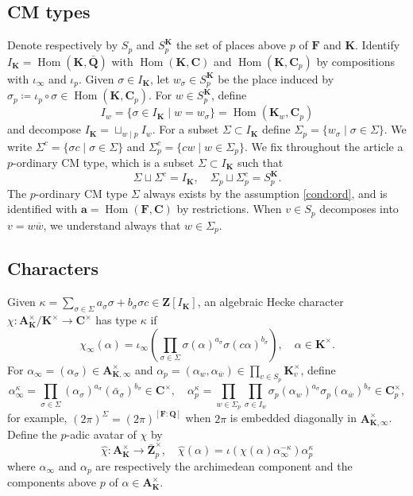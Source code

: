 \documentclass[leqno]{amsart}
\theoremstyle{definition}
\theoremstyle{remark}
\newcommand{\Q}{{\mathbf{Q}}}
\newcommand{\Z}{{\mathbf{Z}}}
\newcommand{\C}{\mathbf C}
\newcommand{\A}{\mathbf A}
\newcommand{\arch}{\mathbf{a}}
\DeclareMathOperator{\Hom}{Hom}
\newcommand{\F}{{\mathbf{F}}} %
\newcommand{\K}{{\mathbf{K}}} %
\newcommand{\bw}{\overline{w}}
\begin{document}
\subsection{CM types}

Denote respectively by $S_p$ and $S_p^\K$ the set of places above $p$
of $\F$ and $\K$.
Identify $I_\K=\Hom(\K,\bar{\Q})$ with
$\Hom(\K,\C)$ and $\Hom(\K,\C_p)$ by compositions with $\iota_\infty$ and $\iota_p$.
Given $\sigma\in I_\K$,
let $w_\sigma\in S_p^\K$ be the place induced by
$\sigma_p\coloneqq \iota_p\circ \sigma\in\Hom(\K,\C_p)$.
For $w\in S_p^\K$, define
\[
    I_w=\{\sigma\in I_\K\mid w=w_\sigma \}=\Hom(\K_w,\C_p)
\]
and decompose $I_\K=\sqcup_{w\mid p}I_w$.
For a subset $\Sigma\subset I_\K$
define $\Sigma_p=\{w_\sigma\mid \sigma\in \Sigma\}$.
We write
$\Sigma^c=\{\sigma c\mid \sigma\in \Sigma\}$ and 
$\Sigma_p^c=\{cw\mid w\in \Sigma_p\}$.
We fix throughout the article a $p$-ordinary CM type,
which is a subset $\Sigma\subset I_\K$ such that
\[
    \Sigma\sqcup \Sigma^c=I_\K,\quad
    \Sigma_p\sqcup \Sigma_p^c=S_p^\K.
\]
The $p$-ordinary CM type $\Sigma$
always exists by the assumption \eqref{cond:ord},
and is identified with $\arch=\Hom(\F,\C)$ by restrictions.
When $v\in S_p$ decomposes into $v=w\bw$,
we understand always that $w\in \Sigma_p$.

\subsection{Characters}

Given 
$\kappa=\sum_{\sigma\in \Sigma} a_\sigma\sigma+b_\sigma\sigma c\in \Z[I_\K]$,
an algebraic Hecke character 
$\chi\colon \A_\K^\times/\K^\times\to \C^\times$ 
has type $\kappa$ if
\[
    \chi_\infty(\alpha)=
    \iota_\infty \left(\prod_{\sigma\in \Sigma} 
    \sigma(\alpha)^{a_\sigma}\sigma(c \alpha)^{b_\sigma}\right),\quad
    \alpha\in \K^\times.
\]
For $\alpha_\infty=(\alpha_\sigma)\in \A_{\K,\infty}^\times$
and $\alpha_p=(\alpha_w,\alpha_{\bw})\in \prod_{v\in S_p}\K_v^\times$, 
define
\[
    \alpha_\infty^\kappa=
    \prod_{\sigma\in \Sigma} 
    (\alpha_\sigma)^{a_\sigma}(\bar{\alpha}_\sigma)^{b_\sigma}\in \C^\times,\quad
    \alpha_p^\kappa=
    \prod_{w\in \Sigma_p}
    \prod_{\sigma\in I_w}
    \sigma_p(\alpha_w)^{a_\sigma}\sigma_p(\alpha_{\bw})^{b_\sigma}\in \C_p^\times,
\]
for example,
$(2\pi)^\Sigma=(2\pi)^{[\F:\Q]}$
when $2\pi$ is embedded diagonally in $\A_{\K,\infty}^\times$.
Define the $p$-adic avatar of $\chi$ by
\[
    \hat{\chi}\colon \A_\K^\times\to \bar{\Z}_p^\times,\quad
    \hat{\chi}(\alpha)=\iota(\chi(\alpha)\alpha_\infty^{-\kappa})\alpha_p^{\kappa}
\]
where $\alpha_\infty$ and $\alpha_p$ are respectively 
the archimedean component and the components above $p$ of $\alpha\in \A_\K^\times$.
\end{document}
